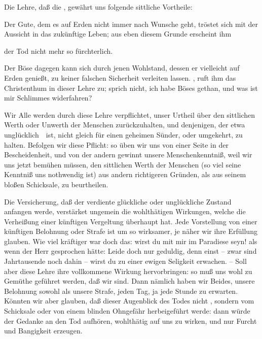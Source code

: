 \begin{aufza}
\item Die Lehre, daß die , gewährt uns folgende sittliche Vortheile:
\begin{aufzb}
\item Der Gute, dem es auf Erden nicht immer nach Wunsche geht, tröstet sich mit der Aussicht in das zukünftige Leben; aus eben diesem Grunde erscheint ihm
\item der Tod nicht mehr so fürchterlich.
\item Der Böse dagegen kann sich durch jenen Wohlstand, dessen er vielleicht auf Erden genießt, zu keiner falschen Sicherheit verleiten lassen. , ruft ihm das Christenthum in dieser Lehre zu; sprich nicht, ich habe Böses gethan, und was ist mir Schlimmes widerfahren?
\item Wir Alle werden durch diese Lehre verpflichtet, unser Urtheil über den sittlichen Werth oder Unwerth der Menschen zurückzuhalten, und denjenigen, der etwa unglücklich~\ ist, nicht gleich für einen geheimen Sünder, oder umgekehrt, zu halten. Befolgen wir diese Pflicht: so üben wir uns von einer Seite in der Bescheidenheit, und von der andern gewinnt unsere Menschenkenntniß, weil wir uns jetzt bemühen müssen, den sittlichen Werth der Menschen (so viel seine Kenntniß uns nothwendig ist) aus andern richtigeren Gründen, als aus seinem bloßen Schicksale, zu beurtheilen.
\end{aufzb}
\item Die Versicherung, daß der verdiente glückliche oder unglückliche Zustand  anfangen werde, verstärket ungemein die wohlthätigen Wirkungen, welche die Verheißung einer künftigen Vergeltung überhaupt hat. Jede Vorstellung von einer künftigen Belohnung oder Strafe ist um so wirksamer, je näher wir ihre Erfüllung glauben. Wie viel kräftiger war doch das:  wirst du mit mir im Paradiese seyn! als wenn der Herr gesprochen hätte: Leide doch nur geduldig, denn einst -- zwar sind Jahrtausende noch dahin -- wirst du zu einer ewigen Seligkeit erwachen. -- Soll aber diese Lehre ihre vollkommene Wirkung hervorbringen: so muß uns wohl zu Gemüthe geführet werden, daß wir  sind. Dann nämlich haben wir Beides, unsere Belohnung sowohl als unsere Strafe, jeden Tag, ja jede Stunde zu erwarten. Könnten wir aber glauben, daß dieser Augenblick des Todes nicht , sondern vom Schicksale oder von einem blinden Ohngefähr herbeigeführt werde: dann würde der Gedanke an den Tod aufhören, wohlthätig auf uns zu wirken, und nur Furcht und Bangigkeit erzeugen.

\end{aufza}
